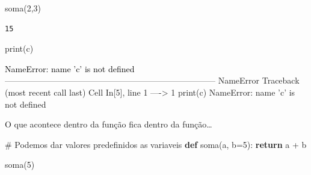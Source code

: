 \documentclass[
  letterpaper,
  DIV=11,
  numbers=noendperiod]{scrreprt}
\newenvironment{Shaded}{\begin{snugshade}}{\end{snugshade}}
\newcommand{\BuiltInTok}[1]{\textcolor[rgb]{0.00,0.23,0.31}{#1}}
\newcommand{\CommentTok}[1]{\textcolor[rgb]{0.37,0.37,0.37}{#1}}
\newcommand{\ControlFlowTok}[1]{\textcolor[rgb]{0.00,0.23,0.31}{\textbf{#1}}}
\newcommand{\DecValTok}[1]{\textcolor[rgb]{0.68,0.00,0.00}{#1}}
\newcommand{\KeywordTok}[1]{\textcolor[rgb]{0.00,0.23,0.31}{\textbf{#1}}}
\newcommand{\NormalTok}[1]{\textcolor[rgb]{0.00,0.23,0.31}{#1}}
\newcommand{\OperatorTok}[1]{\textcolor[rgb]{0.37,0.37,0.37}{#1}}
\begin{document}
\begin{Shaded}
\begin{Highlighting}[]
\NormalTok{soma(}\DecValTok{2}\NormalTok{,}\DecValTok{3}\NormalTok{)}
\end{Highlighting}
\end{Shaded}

\begin{verbatim}
15
\end{verbatim}

\begin{Shaded}
\begin{Highlighting}[]
\BuiltInTok{print}\NormalTok{(c)}
\end{Highlighting}
\end{Shaded}

\begin{Highlighting}
\textcolor{black}{NameError: name 'c' is not defined}
\textcolor{black}{}\textcolor{QuartoInternalColor1}{---------------------------------------------------------------------------}\textcolor{QuartoInternalColor2}{}
\textcolor{QuartoInternalColor2}{}\textcolor{QuartoInternalColor1}{NameError}\textcolor{QuartoInternalColor2}{                                 Traceback (most recent call last)}
\textcolor{QuartoInternalColor2}{Cell }\textcolor{QuartoInternalColor3}{In[5], line 1}\textcolor{QuartoInternalColor2}{}
\textcolor{QuartoInternalColor2}{}\textcolor{QuartoInternalColor3}{----> 1}\textcolor{QuartoInternalColor2}{ }\textcolor{QuartoInternalColor4}{print}\textcolor{QuartoInternalColor2}{(}\textcolor{QuartoInternalColor2}{c}\textcolor{QuartoInternalColor2}{)}
\textcolor{QuartoInternalColor2}{}\textcolor{QuartoInternalColor1}{NameError}\textcolor{QuartoInternalColor2}{: name 'c' is not defined}
\end{Highlighting}

O que acontece dentro da função fica dentro da função\ldots{}

\begin{Shaded}
\begin{Highlighting}[]
\CommentTok{\# Podemos dar valores predefinidos as variaveis}
\KeywordTok{def}\NormalTok{ soma(a, b}\OperatorTok{=}\DecValTok{5}\NormalTok{):}
    \ControlFlowTok{return}\NormalTok{ a }\OperatorTok{+}\NormalTok{ b}
\end{Highlighting}
\end{Shaded}

\begin{Shaded}
\begin{Highlighting}[]
\NormalTok{soma(}\DecValTok{5}\NormalTok{)}
\end{Highlighting}
\end{Shaded}
\end{document}
